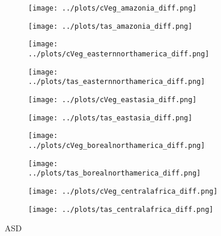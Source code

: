 \documentclass[]{article}
\begin{document}
\begin{figure}[H]
    \centering
    \begin{subfigure}[b]{0.4\linewidth}
        \texttt{[image: ../plots/cVeg\_amazonia\_diff.png]}
    \end{subfigure}
    \begin{subfigure}[b]{0.4\linewidth}
        \texttt{[image: ../plots/tas\_amazonia\_diff.png]}
    \end{subfigure}
    \begin{subfigure}[b]{0.4\linewidth}
        \texttt{[image: ../plots/cVeg\_easternnorthamerica\_diff.png]}
    \end{subfigure}
    \begin{subfigure}[b]{0.4\linewidth}
        \texttt{[image: ../plots/tas\_easternnorthamerica\_diff.png]}
    \end{subfigure}
    \begin{subfigure}[b]{0.4\linewidth}
        \texttt{[image: ../plots/cVeg\_eastasia\_diff.png]}
    \end{subfigure}
    \begin{subfigure}[b]{0.4\linewidth}
        \texttt{[image: ../plots/tas\_eastasia\_diff.png]}
    \end{subfigure}
    \begin{subfigure}[b]{0.4\linewidth}
        \texttt{[image: ../plots/cVeg\_borealnorthamerica\_diff.png]}
    \end{subfigure}
    \begin{subfigure}[b]{0.4\linewidth}
        \texttt{[image: ../plots/tas\_borealnorthamerica\_diff.png]}
    \end{subfigure}
    \begin{subfigure}[b]{0.4\linewidth}
        \texttt{[image: ../plots/cVeg\_centralafrica\_diff.png]}
    \end{subfigure}
    \begin{subfigure}[b]{0.4\linewidth}
        \texttt{[image: ../plots/tas\_centralafrica\_diff.png]}
    \end{subfigure}
    \caption{ASD}
    \label{fig:aus_region_cveg_tas}
\end{figure}
\end{document}
